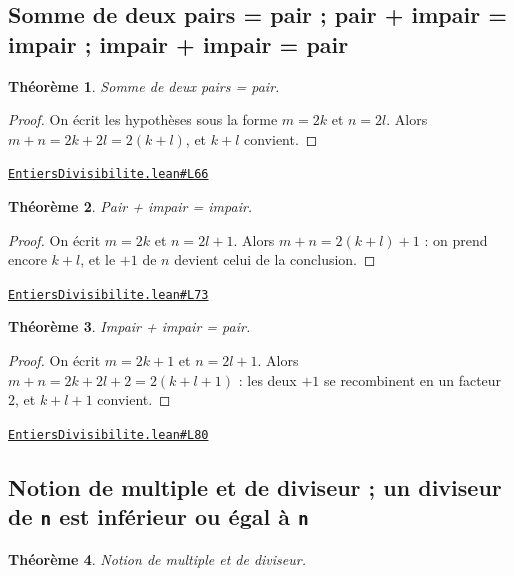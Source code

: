 \documentclass[11pt,a4paper]{article}
\theoremstyle{definition}
\theoremstyle{plain}
\newtheorem{theoreme}{Théorème}
\newcommand{\source}[2]{\par\smallskip\noindent\hfill{\footnotesize\href{#1}{\texttt{#2}}}\par\smallskip}
\begin{document}
\subsection{Somme de deux pairs = pair ; pair + impair = impair ; impair + impair = pair}

\begin{theoreme}
Somme de deux pairs = pair.
\end{theoreme}

\begin{proof}
On écrit les hypothèses sous la forme $m = 2k$ et $n = 2l$. Alors
$m + n = 2k + 2l = 2(k+l)$, et $k + l$ convient.
\end{proof}
\source{https://github.com/Commutator-IO/learn-lean/blob/main/cours/01-college/01-nombres-et-calculs/EntiersDivisibilite.lean\#L66}{EntiersDivisibilite.lean\#L66}

\begin{theoreme}
Pair + impair = impair.
\end{theoreme}

\begin{proof}
On écrit $m = 2k$ et $n = 2l + 1$. Alors $m + n = 2(k+l) + 1$ : on prend encore
$k + l$, et le $+1$ de $n$ devient celui de la conclusion.
\end{proof}
\source{https://github.com/Commutator-IO/learn-lean/blob/main/cours/01-college/01-nombres-et-calculs/EntiersDivisibilite.lean\#L73}{EntiersDivisibilite.lean\#L73}

\begin{theoreme}
Impair + impair = pair.
\end{theoreme}

\begin{proof}
On écrit $m = 2k + 1$ et $n = 2l + 1$. Alors $m + n = 2k + 2l + 2 = 2(k + l + 1)$ : les
deux $+1$ se recombinent en un facteur $2$, et $k + l + 1$ convient.
\end{proof}
\source{https://github.com/Commutator-IO/learn-lean/blob/main/cours/01-college/01-nombres-et-calculs/EntiersDivisibilite.lean\#L80}{EntiersDivisibilite.lean\#L80}

\subsection{Notion de multiple et de diviseur ; un diviseur de \texttt{n} est inférieur ou égal à \texttt{n}}

\begin{theoreme}
Notion de multiple et de diviseur.
\end{theoreme}
\end{document}
